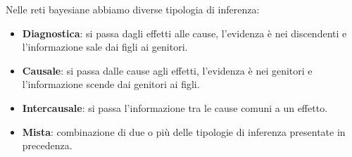 Nelle reti bayesiane abbiamo diverse tipologia di inferenza:
\begin{itemize}
    \item \textbf{Diagnostica}: si passa dagli effetti alle cause, l'evidenza è
          nei discendenti e l'informazione sale dai figli ai genitori.
    \item \textbf{Causale}: si passa dalle cause agli effetti, l'evidenza è
          nei genitori e l'informazione scende dai genitori ai figli.
    \item \textbf{Intercausale}: si passa l'informazione tra le cause comuni
          a un effetto.
    \item \textbf{Mista}: combinazione di due o più delle tipologie di inferenza
          presentate in precedenza.
\end{itemize}
\begin{figure}[!ht]
    \centering
    \begin{subfigure}[b]{0.14\textwidth}

\end{subfigure}
\end{figure}
